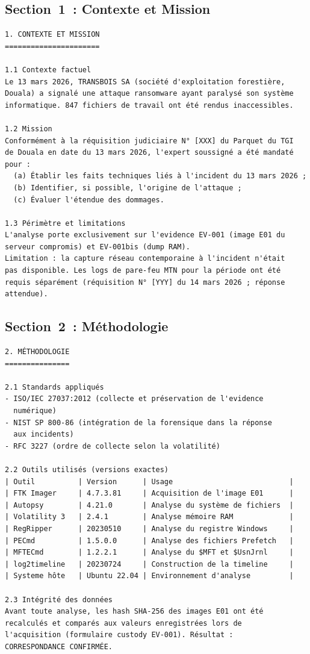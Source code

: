 \subsection{Section~1~: Contexte et Mission}

\begin{lstlisting}[language=bash_forensique,
    caption={Section Contexte et Mission --- exemple MVOM}]
1. CONTEXTE ET MISSION
======================

1.1 Contexte factuel
Le 13 mars 2026, TRANSBOIS SA (société d'exploitation forestière,
Douala) a signalé une attaque ransomware ayant paralysé son système
informatique. 847 fichiers de travail ont été rendus inaccessibles.

1.2 Mission
Conformément à la réquisition judiciaire N° [XXX] du Parquet du TGI
de Douala en date du 13 mars 2026, l'expert soussigné a été mandaté
pour :
  (a) Établir les faits techniques liés à l'incident du 13 mars 2026 ;
  (b) Identifier, si possible, l'origine de l'attaque ;
  (c) Évaluer l'étendue des dommages.

1.3 Périmètre et limitations
L'analyse porte exclusivement sur l'evidence EV-001 (image E01 du
serveur compromis) et EV-001bis (dump RAM).
Limitation : la capture réseau contemporaine à l'incident n'était
pas disponible. Les logs de pare-feu MTN pour la période ont été
requis séparément (réquisition N° [YYY] du 14 mars 2026 ; réponse
attendue).
\end{lstlisting}

\subsection{Section~2~: Méthodologie}

\begin{lstlisting}[language=bash_forensique,
    caption={Section Méthodologie --- exemple}]
2. MÉTHODOLOGIE
===============

2.1 Standards appliqués
- ISO/IEC 27037:2012 (collecte et préservation de l'evidence
  numérique)
- NIST SP 800-86 (intégration de la forensique dans la réponse
  aux incidents)
- RFC 3227 (ordre de collecte selon la volatilité)

2.2 Outils utilisés (versions exactes)
| Outil          | Version      | Usage                           |
| FTK Imager     | 4.7.3.81     | Acquisition de l'image E01      |
| Autopsy        | 4.21.0       | Analyse du système de fichiers  |
| Volatility 3   | 2.4.1        | Analyse mémoire RAM             |
| RegRipper      | 20230510     | Analyse du registre Windows     |
| PECmd          | 1.5.0.0      | Analyse des fichiers Prefetch   |
| MFTECmd        | 1.2.2.1      | Analyse du $MFT et $UsnJrnl     |
| log2timeline   | 20230724     | Construction de la timeline     |
| Systeme hôte   | Ubuntu 22.04 | Environnement d'analyse         |

2.3 Intégrité des données
Avant toute analyse, les hash SHA-256 des images E01 ont été
recalculés et comparés aux valeurs enregistrées lors de
l'acquisition (formulaire custody EV-001). Résultat :
CORRESPONDANCE CONFIRMÉE.
\end{lstlisting}

